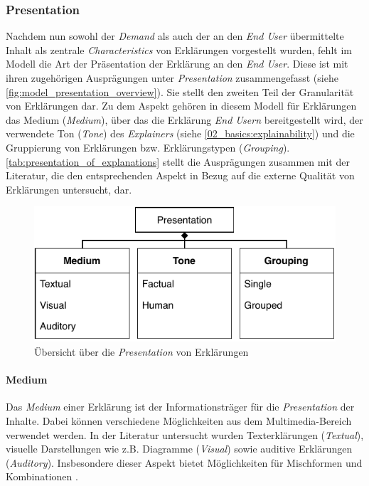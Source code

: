\subsubsection{Presentation}

Nachdem nun sowohl der \textit{Demand} als auch der an den \textit{End User} übermittelte Inhalt als zentrale \textit{Characteristics} von Erklärungen vorgestellt wurden, fehlt im Modell die Art der Präsentation der Erklärung an den \textit{End User}. Diese ist mit ihren zugehörigen Ausprägungen unter \textit{Presentation} zusammengefasst (siehe \autoref{fig:model_presentation_overview}). Sie stellt den zweiten Teil der Granularität von Erklärungen dar. Zu dem Aspekt gehören in diesem Modell für Erklärungen das Medium (\textit{Medium}), über das die Erklärung \textit{End Usern} bereitgestellt wird, der verwendete Ton (\textit{Tone}) des \textit{Explainers} (siehe \autoref{02_basics:explainability}) \cite[vgl.][]{chazette_knowledge_nodate} und die Gruppierung von Erklärungen bzw. Erklärungstypen (\textit{Grouping}). \autoref{tab:presentation_of_explanations} stellt die Ausprägungen zusammen mit der Literatur, die den entsprechenden Aspekt in Bezug auf die externe Qualität von Erklärungen untersucht, dar.

\begin{figure}[t!]
    \begin{center}
        \includegraphics{contents/05_model_description/res/model_presentation_overview.pdf}
    \end{center}
    \caption{Übersicht über die \textit{Presentation} von Erklärungen}
    \label{fig:model_presentation_overview}
\end{figure}

\paragraph{Medium} Das \textit{Medium} einer Erklärung ist der Informationsträger für die \textit{Presentation} der Inhalte. Dabei können verschiedene Möglichkeiten aus dem Multimedia-Bereich verwendet werden. In der Literatur untersucht wurden Texterklärungen (\textit{Textual}), visuelle Darstellungen wie z.B. Diagramme (\textit{Visual}) sowie auditive Erklärungen (\textit{Auditory}). Insbesondere dieser Aspekt bietet Möglichkeiten für Mischformen und Kombinationen \cite{kouki_user_2017}.

